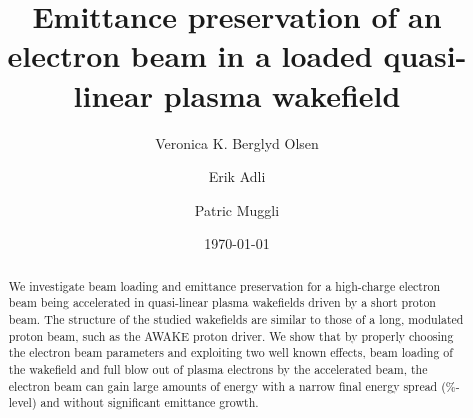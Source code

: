 \documentclass[aps,prstab,reprint,amsmath,amssymb,groupedaddress]{revtex4-1}
\begin{document}


\title{Emittance preservation of an electron beam in a loaded quasi-linear plasma wakefield}

\author{Veronica K. Berglyd Olsen}

\author{Erik Adli}

\author{Patric Muggli}

\date{\today}

\begin{abstract}
We investigate beam loading and emittance preservation for a high-charge electron beam being accelerated in quasi-linear
plasma wakefields driven by a short proton beam. The structure of the studied wakefields are similar to those of a long,
modulated proton beam, such as the AWAKE proton driver. We show that by properly choosing the electron beam parameters
and exploiting two well known effects, beam loading of the wakefield and full blow out of plasma electrons by the
accelerated beam, the electron beam can gain large amounts of energy with a narrow final energy spread (\%-level) and
without significant emittance growth.
\end{abstract}
\end{document}
